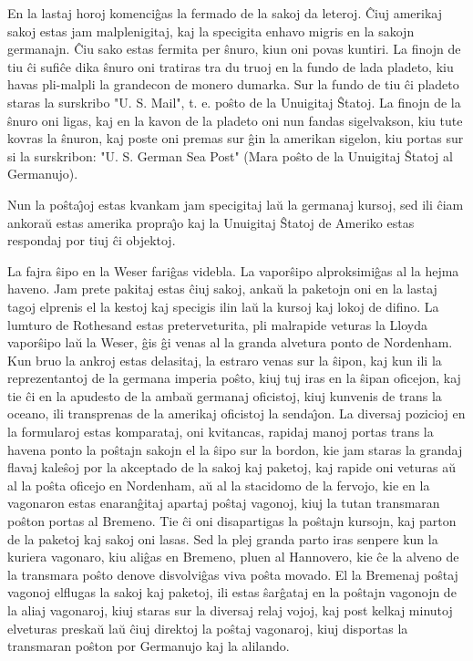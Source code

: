    En la lastaj horoj komenci\^gas la fermado de la sakoj da leteroj.
\^Ciuj amerikaj sakoj estas jam malplenigitaj, kaj la specigita
enhavo migris en la sakojn germanajn. \^Ciu sako estas fermita per
\^snuro, kiun oni povas kuntiri. La finojn de tiu \^ci sufi\^ce dika
\^snuro oni tratiras tra du truoj en la fundo de lada pladeto, kiu
havas pli-malpli la grandecon de monero dumarka. Sur la fundo de tiu
\^ci pladeto staras la surskribo "U. S. Mail", t. e. po\^sto de la
Unuigitaj \^Statoj. La finojn de la \^snuro oni ligas, kaj en la
kavon de la pladeto oni nun fandas sigelvakson, kiu tute kovras la
\^snuron, kaj poste oni premas sur \^gin la amerikan sigelon, kiu
portas sur si la surskribon: "U. S. German Sea Post" (Mara po\^sto
de la Unuigitaj \^Statoj al Germanujo).

   Nun la po\^sta\^{\j}oj estas kvankam jam specigitaj la\u u la germanaj
kursoj, sed ili \^ciam ankora\u u estas amerika propra\^{\j}o kaj la
Unuigitaj \^Statoj de Ameriko estas respondaj por tiuj \^ci
objektoj.

   La fajra \^sipo en la Weser fari\^gas videbla. La vapor\^sipo
alproksimi\^gas al la hejma haveno. Jam prete pakitaj estas \^ciuj
sakoj, anka\u u la paketojn oni en la lastaj tagoj elprenis el la
kestoj kaj specigis ilin la\u u la kursoj kaj lokoj de difino. La
lumturo de Rothesand estas preterveturita, pli malrapide veturas la
Lloyda vapor\^sipo la\u u la Weser, \^gis \^gi venas al la granda
alvetura ponto de Nordenham. Kun bruo la ankroj estas delasitaj, la
estraro venas sur la \^sipon, kaj kun ili la reprezentantoj de la
germana imperia po\^sto, kiuj tuj iras en la \^sipan oficejon, kaj
tie \^ci en la apudesto de la amba\u u germanaj oficistoj, kiuj
kunvenis de trans la oceano, ili transprenas de la amerikaj
oficistoj la senda\^{\j}on. La diversaj pozicioj en la formularoj
estas komparataj, oni kvitancas, rapidaj manoj portas trans la
havena ponto la po\^stajn sakojn el la \^sipo sur la bordon, kie jam
staras la grandaj flavaj kale\^soj por la akceptado de la sakoj kaj
paketoj, kaj rapide oni veturas a\u u al la po\^sta oficejo en
Nordenham, a\u u al la stacidomo de la fervojo, kie en la vagonaron
estas enaran\^gitaj apartaj po\^staj vagonoj, kiuj la tutan
transmaran po\^ston portas al Bremeno. Tie \^ci oni disapartigas la
po\^stajn kursojn, kaj parton de la paketoj kaj sakoj oni lasas. Sed
la plej granda parto iras senpere kun la kuriera vagonaro, kiu
ali\^gas en Bremeno, pluen al Hannovero, kie \^ce la alveno de la
transmara po\^sto denove disvolvi\^gas viva po\^sta movado. El la
Bremenaj po\^staj vagonoj elflugas la sakoj kaj paketoj, ili estas
\^sar\^gataj en la po\^stajn vagonojn de la aliaj vagonaroj, kiuj
staras sur la diversaj relaj vojoj, kaj post kelkaj minutoj
elveturas preska\u u la\u u \^ciuj direktoj la po\^staj vagonaroj,
kiuj disportas la transmaran po\^ston por Germanujo kaj la alilando.

